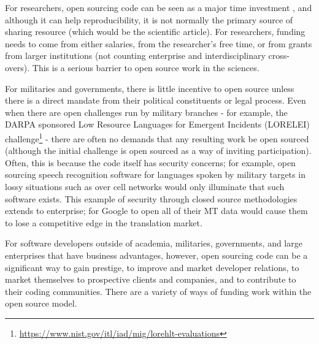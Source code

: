 For researchers, open sourcing code can be seen as a major time investment \citep{fitzjohn2014reproducible, lowndes2017our}, and although it can help reproducibility, it is not normally the primary source of sharing resource (which would be the scientific article). For researchers, funding needs to come from either salaries, from the researcher's free time, or from grants from larger institutions (not counting enterprise and interdisciplinary cross-overs). This is a serious barrier to open source work in the sciences.

For militaries and governments, there is little incentive to open source unless there is a direct mandate from their political constituents or legal process. Even when there are open challenges run by military branches - for example, the DARPA sponsored Low Resource Languages for Emergent Incidents (LORELEI) challenge\footnote{\href{https://www.nist.gov/itl/iad/mig/lorehlt-evaluations}{https://www.nist.gov/itl/iad/mig/lorehlt-evaluations}} - there are often no demands that any resulting work be open sourced (although the initial challenge is open sourced as a way of inviting participation). Often, this is because the code itself has security concerns; for example, open sourcing speech recognition software for languages spoken by military targets in lossy situations such as over cell networks would only illuminate that such software exists. This example of security through closed source methodologies extends to enterprise; for Google to open all of their MT data would cause them to lose a competitive edge in the translation market.

For software developers outside of academia, militaries, governments, and large enterprises that have business advantages, however, open sourcing code can be a significant way to gain prestige, to improve and market developer relations, to market themselves to prospective clients and companies, and to contribute to their coding communities. There are a variety of ways of funding work within the open source model.

